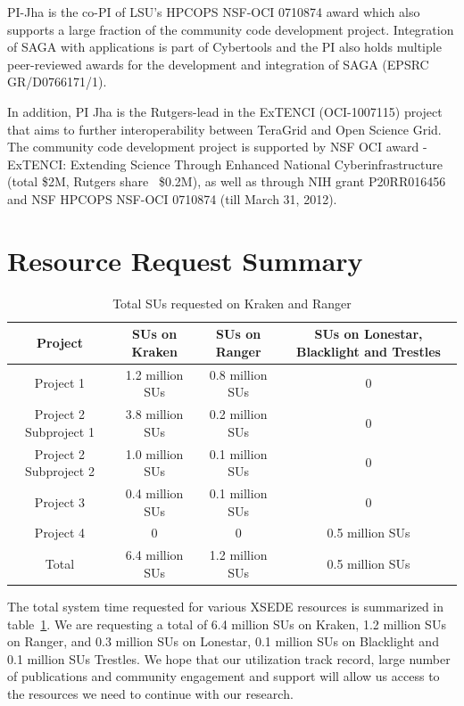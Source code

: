 \documentclass[a4paper,11pt]{article}
\newcommand{\up}{\vspace*{-1em}}
\begin{document}
PI-Jha is the co-PI of LSU's HPCOPS NSF-OCI 0710874 award which also supports a large fraction of the community code development project. Integration of SAGA with applications is part of Cybertools and the PI also holds multiple peer-reviewed awards for the development and integration of SAGA (EPSRC GR/D0766171/1). %

In addition, PI Jha is the Rutgers-lead in the ExTENCI (OCI-1007115) project that aims to further interoperability between TeraGrid and Open Science Grid.  The community code development project is supported by NSF OCI award - ExTENCI: Extending Science Through Enhanced National Cyberinfrastructure (total \$2M, Rutgers share ~\$0.2M), as well as through NIH grant P20RR016456 and NSF HPCOPS NSF-OCI 0710874 (till March 31, 2012).

\section{Resource Request Summary}

\begin{table}[!h]
\begin{center}
\begin{tabular}{|c|c|c|c| }
\hline 
Project & SUs on Kraken & SUs on Ranger  & SUs on Lonestar, Blacklight and Trestles\\ 
\hline
Project 1 & 1.2 million SUs  & 0.8 million SUs & 0 \\
\hline
Project 2 Subproject 1 & 3.8 million SUs   & 0.2 million SUs & 0 \\
\hline
Project 2 Subproject 2 & 1.0 million SUs & 0.1 million SUs & 0\\
\hline
Project 3 & 0.4 million SUs & 0.1 million SUs & 0\\
\hline
Project 4 & 0 & 0 & 0.5 million SUs\\
\hline
\hline
Total  & 6.4 million SUs & 1.2 million SUs & 0.5 million SUs\\
\hline
\end{tabular}
\end{center}
  \caption{Total SUs requested on Kraken and Ranger}\label{table:systems}
\up
\end{table}


The total system time requested for various XSEDE resources is summarized in table~\ref{table:systems}.
We are requesting a total of 6.4 million SUs on Kraken, 1.2 million SUs on Ranger, and 0.3 million SUs on Lonestar, 0.1 million SUs on Blacklight and 0.1 million SUs Trestles. We hope that our utilization track record, large number of publications and community engagement and support will allow us access to the resources we need to continue with our research.




\end{document}
